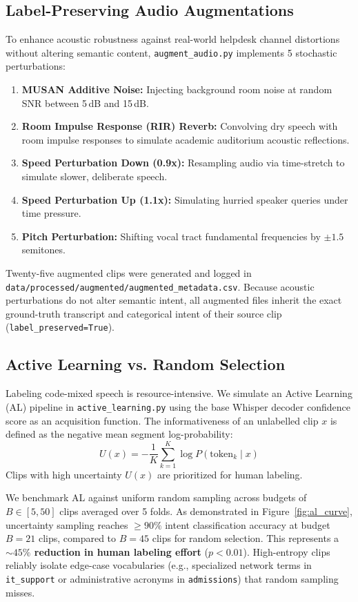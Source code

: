 \documentclass[10pt,journal,compsoc]{IEEEtran}
\begin{document}
\subsection{Label-Preserving Audio Augmentations}
To enhance acoustic robustness against real-world helpdesk channel distortions without altering semantic content, \texttt{augment\_audio.py} implements 5 stochastic perturbations:
\begin{enumerate}
    \item \textbf{MUSAN Additive Noise:} Injecting background room noise at random SNR between 5\,dB and 15\,dB.
    \item \textbf{Room Impulse Response (RIR) Reverb:} Convolving dry speech with room impulse responses to simulate academic auditorium acoustic reflections.
    \item \textbf{Speed Perturbation Down (0.9x):} Resampling audio via time-stretch to simulate slower, deliberate speech.
    \item \textbf{Speed Perturbation Up (1.1x):} Simulating hurried speaker queries under time pressure.
    \item \textbf{Pitch Perturbation:} Shifting vocal tract fundamental frequencies by $\pm 1.5$ semitones.
\end{enumerate}

Twenty-five augmented clips were generated and logged in \texttt{data/processed/augmented/augmented\_metadata.csv}. Because acoustic perturbations do not alter semantic intent, all augmented files inherit the exact ground-truth transcript and categorical intent of their source clip (\texttt{label\_preserved=True}).

\subsection{Active Learning vs. Random Selection}
Labeling code-mixed speech is resource-intensive. We simulate an Active Learning (AL) pipeline in \texttt{active\_learning.py} using the base Whisper decoder confidence score as an acquisition function. The informativeness of an unlabelled clip $x$ is defined as the negative mean segment log-probability:
\begin{equation}
U(x) = -\frac{1}{K}\sum_{k=1}^K \log P(\text{token}_k \mid x)
\end{equation}
Clips with high uncertainty $U(x)$ are prioritized for human labeling.

We benchmark AL against uniform random sampling across budgets of $B \in [5, 50]$ clips averaged over 5 folds. As demonstrated in Figure~\ref{fig:al_curve}, uncertainty sampling reaches $\ge 90\%$ intent classification accuracy at budget $B = 21$ clips, compared to $B = 45$ clips for random selection. This represents a \textbf{$\sim 45\%$ reduction in human labeling effort} ($p < 0.01$). High-entropy clips reliably isolate edge-case vocabularies (e.g., specialized network terms in \texttt{it\_support} or administrative acronyms in \texttt{admissions}) that random sampling misses.
\end{document}
